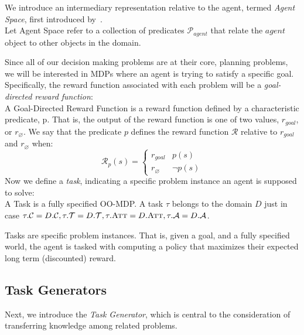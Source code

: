 \documentclass[11pt]{article}
\begin{document}
We introduce an intermediary representation relative to the agent, termed {\it Agent Space}, first introduced by~\cite{konidaris2006framework}.\\

{ Let \textup{Agent Space} refer to a collection of predicates $\mathcal{P}_{agent}$ that relate the $agent$ object to other objects in the domain}.

Since all of our decision making problems are at their core, planning problems, we will be interested in MDPs where an agent is trying to satisfy a specific goal. Specifically, the reward function associated with each problem will be a {\it goal-directed reward function}: \\

{ A \textup{Goal-Directed Reward Function} is a reward function defined by a characteristic predicate, p. That is, the output of the reward function is one of two values, $r_{goal}$, or $r_\varnothing$. We say that the predicate $p$ defines the reward function $\mathcal{R}$ relative to $r_{goal}$ and $r_\varnothing$ when:
\begin{equation}
\mathcal{R}_p(s) = \begin{cases}
r_{goal}& p(s) \\
r_\varnothing&\neg p(s)
\end{cases}
\end{equation}}
Now we define a {\it task}, indicating a specific problem instance an agent is supposed to solve: \\

{ A \textup{Task} is a fully specified OO-MDP. A task $\tau$ belongs to the domain $D$ just in case $\tau.\mathcal{C} = D.\mathcal{C}, \tau.\mathcal{T} = D.\mathcal{T}, \tau.\textsc{Att}= D.\textsc{Att}, \tau.\mathcal{A} = D.\mathcal{A}$}.

Tasks are specific problem instances. That is, given a goal, and a fully specified world, the agent is tasked with computing a policy that maximizes their expected long term (discounted) reward.

\subsection{Task Generators}
Next, we introduce the {\it Task Generator}, which is central to the consideration of transferring knowledge among related problems. \\
\end{document}
